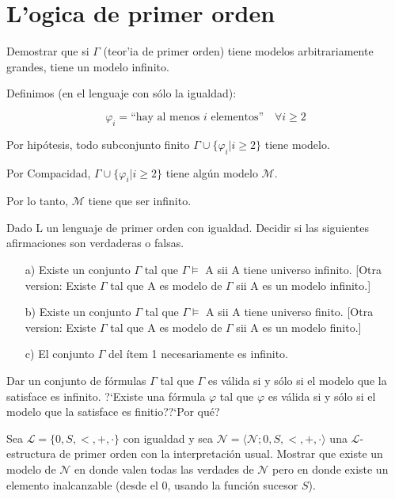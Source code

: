 \section{L'ogica de primer orden} 
\begin{questions}

\question Demostrar que si $\Gamma$ (teor'ia de primer orden) tiene modelos arbitrariamente grandes, tiene un modelo infinito. 

\begin{solution}
 Definimos (en el lenguaje con s\'olo la igualdad): 
 
 \begin{equation*}
  \varphi_i = \text{``hay al menos $i$ elementos''} \quad \forall i \geq 2
 \end{equation*}

 Por hip\'otesis, todo subconjunto finito $\Gamma\cup\{\varphi_i | i\geq2\}$ tiene modelo. 
 
 Por Compacidad, $\Gamma\cup\{\varphi_i | i \geq 2\}$ tiene alg\'un modelo $\mathcal{M}$.
 
 Por lo tanto, $\mathcal{M}$ tiene que ser infinito. 
\end{solution}

\question Dado L un lenguaje de primer orden con igualdad. Decidir si las siguientes afirmaciones son verdaderas o falsas. 

\begin{enumerate}
  \item[a)] Existe un conjunto $\Gamma$ tal que $\Gamma \models$ A sii A tiene universo infinito. [Otra version: Existe $\Gamma$ tal que A es modelo de $\Gamma$ sii A es un modelo infinito.]
  
  \item[b)] Existe un conjunto $\Gamma$ tal que $\Gamma \models$ A sii A tiene universo finito. [Otra version: Existe $\Gamma$ tal que A es modelo de $\Gamma$ sii A es un modelo finito.]
  
  \item[c)] El conjunto $\Gamma$ del ítem 1 necesariamente es infinito.
\end{enumerate}

\question Dar un conjunto de f\'ormulas $\Gamma$ tal que $\Gamma$ es v\'alida si y s\'olo si el modelo que la satisface es infinito. ?`Existe una f\'ormula $\varphi$ tal que $\varphi$ es v\'alida si y s\'olo si el modelo que la satisface es finitio??`Por qu\'e?

\question Sea $\mathcal{L} = \{ 0, S, <, +, \cdot \}$ con igualdad y sea $\mathcal{N} = \langle \mathcal{N}; 0, S, <, +, \cdot \rangle$ una $\mathcal{L}$-estructura de primer orden con la interpretación usual. Mostrar que existe un modelo de $\mathcal{N}$ en donde valen todas las verdades de $\mathcal{N}$ pero en donde existe un elemento inalcanzable (desde el 0, usando la función sucesor $S$). \label{modelo-no-estandar}


\end{questions}
